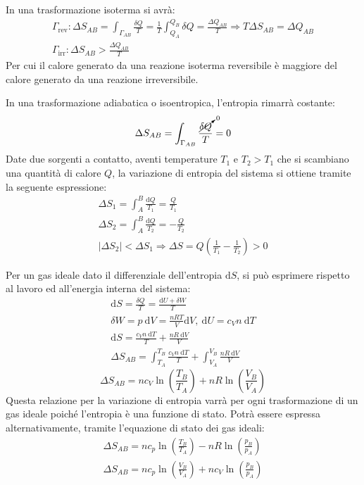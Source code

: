 \documentclass{article}
\newcommand{\df}{\mathrm{d}}
\numberwithin{equation}{subsection}
\begin{document}
In una trasformazione isoterma si avrà:
\begin{gather*}
    \Gamma_{\mathrm{rev}}:\Delta S_{AB}=\displaystyle\int_{\Gamma_{AB}}\frac{\delta Q}{T}=\frac{1}{T}\int_{Q_A}^{Q_B}\delta Q=\frac{\Delta Q_{AB}}{T}\Rightarrow T\Delta S_{AB}=\Delta Q_{AB}\\
    \Gamma_{\mathrm{irr}}:\Delta S_{AB}>\frac{\Delta Q_{AB}}{T}
\end{gather*}
Per cui il calore generato da una reazione isoterma reversibile è maggiore del calore generato da una reazione irreversibile. 


In una trasformazione adiabatica o isoentropica, l'entropia rimarrà costante:
\begin{equation*}
    \Delta S_{AB}=\displaystyle\int_{\Gamma_{AB}}\frac{\cancelto{0}{\delta Q}}{T}=0
\end{equation*}
Date due sorgenti a contatto, aventi temperature $T_1$ e $T_2>T_1$ che si scambiano una quantità di calore $Q$, la variazione di entropia del 
sistema si ottiene tramite la seguente espressione: 
\begin{gather*}
    \Delta S_1=\displaystyle\int_{A}^B\frac{\df Q}{T_1}=\frac{Q}{T_1}\\
    \Delta S_2=\displaystyle\int_{A}^B\frac{\df Q}{T_2}=-\frac{Q}{T_2}\\
    |\Delta S_2|<\Delta S_1\Rightarrow\Delta S=Q\left(\displaystyle\frac{1}{T_1}-\frac{1}{T_2}\right)>0
\end{gather*}

Per un gas ideale dato il differenziale dell'entropia $\df S$, si può esprimere rispetto al lavoro ed all'energia interna del sistema:
\begin{gather*}
    \df S=\displaystyle\frac{\delta Q}{T}=\frac{\df U+\delta W}{T}\\
    \delta  W=p\:\df V=\displaystyle\frac{nRT}{V}\df V,\:\df U=c_Vn\:\df T\\
    \df S=\displaystyle\frac{c_Vn\:\df T}{T}+\frac{nR\:\df V}{V}\\
    \Delta S_{AB}=\int_{T_A}^{T_B}\displaystyle\frac{c_Vn\:\df T}{T}+\int_{V_A}^{V_B}\frac{nR\:\df V}{V}
\end{gather*} 
\begin{equation}
    \Delta S_{AB}=nc_V\ln\left(\displaystyle\frac{T_B}{T_A}\right)+nR\ln\left(\frac{V_B}{V_A}\right)
\end{equation}
Questa relazione per la variazione di entropia varrà per ogni trasformazione di un gas ideale poiché l'entropia è una funzione di stato. Potrà essere espressa 
alternativamente, tramite l'equazione di stato dei gas ideali:
\begin{gather}
    \Delta S_{AB}=nc_p\ln\left(\displaystyle\frac{T_B}{T_A}\right)-nR\ln\left(\displaystyle\frac{p_B}{p_A}\right)\\
    \Delta S_{AB}=nc_p\ln\left(\displaystyle\frac{V_B}{V_A}\right)+nc_V\ln\left(\frac{p_B}{p_A}\right)
\end{gather}
\end{document}
